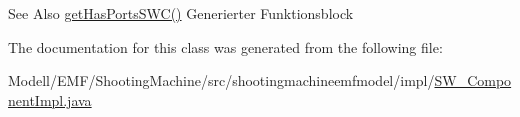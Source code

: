 \begin{DoxySeeAlso}{See Also}
\hyperlink{classshootingmachineemfmodel_1_1impl_1_1_s_w___component_impl_a506d6529374f47b28cb78ec920852c3b}{get\-Has\-Ports\-S\-W\-C()} Generierter Funktionsblock  
\end{DoxySeeAlso}


The documentation for this class was generated from the following file\-:\begin{DoxyCompactItemize}
\item 
Modell/\-E\-M\-F/\-Shooting\-Machine/src/shootingmachineemfmodel/impl/\hyperlink{_s_w___component_impl_8java}{S\-W\-\_\-\-Component\-Impl.\-java}\end{DoxyCompactItemize}
